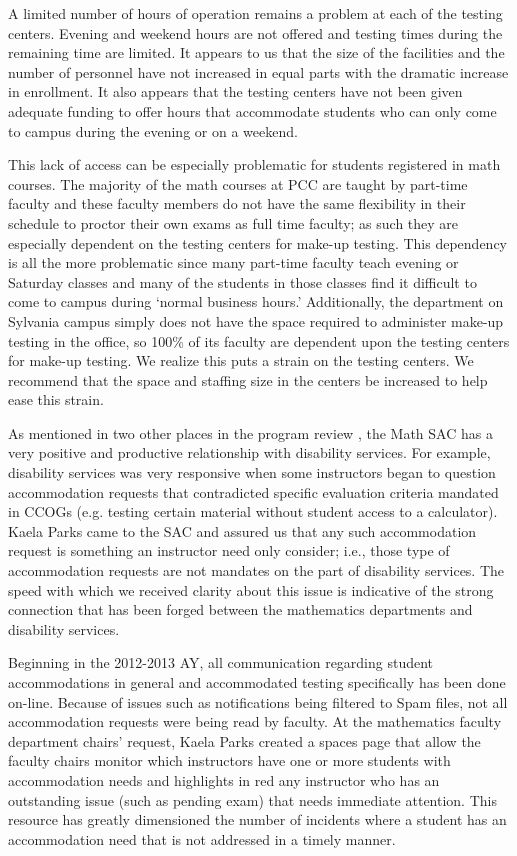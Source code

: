 A limited number of hours of operation remains a problem at each of the testing centers.   Evening and weekend hours are not offered and testing times during the remaining time are limited.  It appears to us that the size of  the facilities and the number of personnel  have not increased in equal parts with the dramatic increase in enrollment.   It also appears that the testing centers have not been given adequate funding to offer hours that accommodate students who can only come to campus during the evening or on a weekend.

This lack of access can be especially problematic for students registered in math courses.  The majority of the math courses at PCC are taught by part-time faculty and these faculty members do not have the same flexibility in their schedule to proctor their own exams as full time faculty; as such they are especially dependent on the testing centers for make-up testing. This dependency is all the more problematic since many part-time faculty teach evening or Saturday classes and many of the students in those classes find it difficult to come to campus during `normal business hours.' Additionally, the department on Sylvania campus simply does not have the space required to administer make-up testing in the office, so 100\% of its faculty are dependent upon the testing centers for make-up testing.   We realize this puts a strain on the testing centers.  We recommend that the space and staffing size in the centers be increased to help ease this strain.

As mentioned in two other places in the program review , the Math SAC has a very positive and productive relationship with disability services.  For example, disability services was very responsive when some instructors began to question accommodation requests that contradicted specific evaluation criteria mandated in CCOGs (e.g. testing certain material without student access to a calculator).  Kaela Parks came to the SAC and assured us that any such accommodation request is something an instructor need only consider; i.e., those type of accommodation requests are not mandates on the part of disability services.  The speed with which we received clarity about this issue is indicative of the strong connection that has been forged between the mathematics departments and disability services.

Beginning in the 2012-2013 AY, all communication regarding student accommodations in general and accommodated testing specifically has been done on-line.  Because of issues such as notifications being filtered to Spam files, not all accommodation requests were being read by faculty.  At the  mathematics faculty department chairs' request, Kaela Parks created a spaces page that allow the faculty chairs monitor which instructors have one or more students with accommodation needs and highlights in red any instructor who has an outstanding issue (such as pending exam) that needs immediate attention.  This resource has greatly dimensioned the number of incidents where a student has an accommodation need that is not addressed in a timely manner.

